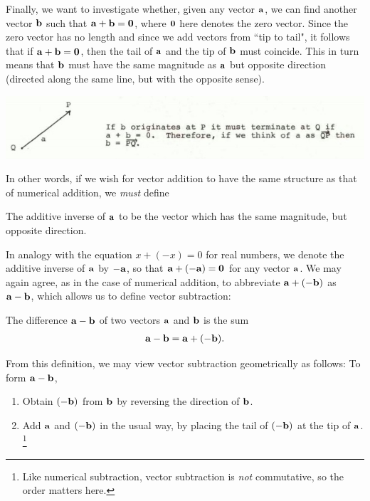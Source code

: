 \documentclass[12pt,letterpaper,reqno]{article}
\numberwithin{equation}{section}
\newcommand{\ti}[1]{\textit{#1}}
\begin{document}
Finally, we want to investigate whether, given any vector ${\bf a}$, we can find another vector ${\bf b}$ such that ${\bf a}+{\bf b}={\bf 0}$, where ${\bf 0}$ here denotes the zero vector. Since the zero vector has no length and since we add vectors from ``tip to tail", it follows that if ${\bf a}+{\bf b}={\bf 0}$, then the tail of ${\bf a}$ and the tip of ${\bf b}$ must coincide. This in turn means that ${\bf b}$ must have the same magnitude as ${\bf a}$ but opposite direction (directed along the same line, but with the opposite sense).  
\begin{center}
	\includegraphics[scale=0.5]{figures_mvc/a_plus_b_equals_zero}
\end{center}
In other words, if we wish for vector addition to have the same structure as that of numerical addition, we \ti{must} define 
\begin{defn}
The additive inverse of ${\bf a}$ to be the vector which has the same magnitude, but opposite direction. 	
\end{defn}
In analogy with the equation $x+(-x)=0$ for real numbers, we denote the additive inverse of ${\bf a}$ by $-{\bf a}$, so that ${\bf a}+(-{\bf a})={\bf 0}$ for any vector ${\bf a}$. We may again agree, as in the case of numerical addition, to abbreviate ${\bf a}+(-{\bf b})$ as ${\bf a}-{\bf b}$, which allows us to define vector subtraction:

\begin{defn}
	The difference ${\bf a}-{\bf b}$ of two vectors ${\bf a}$ and ${\bf b}$ is the sum
	\begin{align*}
		{\bf a}-{\bf b}={\bf a}+(-{\bf b}).
	\end{align*}
\end{defn}
From this definition, we may view vector subtraction geometrically as follows: To form ${\bf a}-{\bf b}$,
\begin{enumerate}[(1)]
	\item Obtain $(-{\bf b})$ from ${\bf b}$ by reversing the direction of ${\bf b}$.
	\item Add ${\bf a}$ and $(-{\bf b})$ in the usual way, by placing the tail of $(-{\bf b})$ at the tip of ${\bf a}$. \footnote{Like numerical subtraction, vector subtraction is \ti{not} commutative, so the order matters here.}
\end{enumerate}
\end{document}
